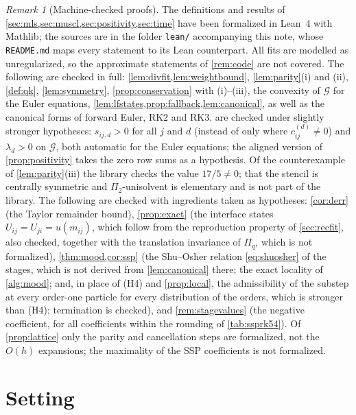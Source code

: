 \documentclass[11pt,a4paper]{article}
\theoremstyle{plain}
\theoremstyle{definition}
\theoremstyle{remark}
\newtheorem{remark}[theorem]{Remark}
\numberwithin{equation}{section}
\newcommand{\Ad}{\mathcal{G}}
\begin{document}
\begin{remark}[Machine-checked proofs]\label{rem:lean}
The definitions and results of \cref{sec:mls,sec:muscl,sec:positivity,sec:time} have been formalized in Lean~4 with Mathlib; the sources are in the folder \texttt{lean/} accompanying this note, whose \texttt{README.md} maps every statement to its Lean counterpart. All fits are modelled as unregularized, so the approximate statements of \cref{rem:code} are not covered. The following are checked in full: \cref{lem:divfit,lem:weightbound}, \cref{lem:parity}(i) and (ii), \cref{def:qk}, \cref{lem:symmetry}, \cref{prop:conservation} with (i)--(iii), the convexity of $\Ad$ for the Euler equations, \cref{lem:lfstates,prop:fallback,lem:canonical}, as well as the canonical forms of forward Euler, RK2 and RK3.  are checked under slightly stronger hypotheses: $s_{ij,d}>0$ for all $j$ and $d$ (instead of only where $c^{(d)}_{ij}\ne0$) and $\lambda_d>0$ on $\Ad$, both automatic for the Euler equations; the aligned version of \cref{prop:positivity} takes the zero row sums as a hypothesis. Of the counterexample of \cref{lem:parity}(iii) the library checks the value $17/5\ne0$; that the stencil is centrally symmetric and $\Pi_2$-unisolvent is elementary and is not part of the library. The following are checked with ingredients taken as hypotheses: \cref{cor:derr} (the Taylor remainder bound), \cref{prop:exact} (the interface states $U_{ij}=U_{ji}=u(m_{ij})$, which follow from the reproduction property of \cref{sec:recfit}, also checked, together with the translation invariance of $\Pi_q$, which is not formalized), \cref{thm:mood,cor:ssp} (the Shu--Osher relation \eqref{eq:shuosher} of the stages, which is not derived from \cref{lem:canonical} there; the exact locality of \cref{alg:mood}; and, in place of (H4) and \cref{prop:local}, the admissibility of the substep at every order-one particle for every distribution of the orders, which is stronger than (H4); termination is checked), and \cref{rem:stagevalues} (the negative coefficient, for all coefficients within the rounding of \cref{tab:ssprk54}). Of \cref{prop:lattice} only the parity and cancellation steps are formalized, not the $O(h)$ expansions; the maximality of the SSP coefficients is not formalized.
\end{remark}

\section{Setting}\label{sec:setting}
\end{document}
